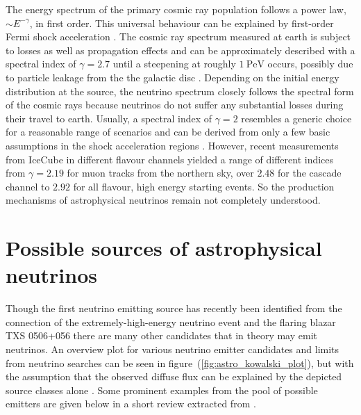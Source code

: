 The energy spectrum of the primary cosmic ray population follows a power law, $\sim E^{-\gamma}$, in first order.
This universal behaviour can be explained by first-order Fermi shock acceleration \cite{Malkov:2001tu,Baring:1997ka,BellShockAcc1,BellShockAcc2}.
The cosmic ray spectrum measured at earth is subject to losses as well as propagation effects and can be approximately described with a spectral index of $\gamma=\num{2.7}$ until a steepening at roughly $\SI{1}{\peta\eV}$ occurs, possibly due to particle leakage from the the galactic disc \cite{Moskalenko:2003en,Moskalenko:2013galprop,Gaisser:2013bla,Gaisser:2010historic,Hoerandel:2002yg,Grupen:2005rx,Gondolo:1995fq}.
Depending on the initial energy distribution at the source, the neutrino spectrum closely follows the spectral form of the cosmic rays because neutrinos do not suffer any substantial losses during their travel to earth.
Usually, a spectral index of $\gamma=2$ resembles a generic choice for a reasonable range of scenarios and can be derived from only a few basic assumptions in the shock acceleration regions \cite{Lipari:2008zf,BellShockAcc1,Gaisser:1990vg}.
However, recent measurements from IceCube in different flavour channels yielded a range of different indices from $\gamma=\num{2.19}$ \cite{Haack:2017dxi} for muon tracks from the northern sky, over $\num{2.48}$ \cite{Niederhausen:2017mjk} for the cascade channel to $\num{2.92}$ \cite{Kopper:2017zzm} for all flavour, high energy starting events.
So the production mechanisms of astrophysical neutrinos remain not completely understood.

\section{Possible sources of astrophysical neutrinos}
Though the first neutrino emitting source has recently been identified from the connection of the extremely-high-energy neutrino event and the flaring blazar TXS 0506+056 \cite{IceCube:2018dnn} there are many other candidates that in theory may emit neutrinos.
An overview plot for various neutrino emitter candidates and limits from neutrino searches can be seen in figure~(\ref{fig:astro_kowalski_plot}), but with the assumption that the observed diffuse flux can be explained by the depicted source classes alone \cite{Kowalski:2014zda}.
Some prominent examples from the pool of possible emitters are given below in a short review extracted from \cite{Grupen:2005rx,Gaisser:2016uoy,Meszaros:2017fcs,Dermer:2016jmw,Dermer:2006xt, Mertsch:2016hcd,Boettcher:2012ssc,Urry:1995mg}.

